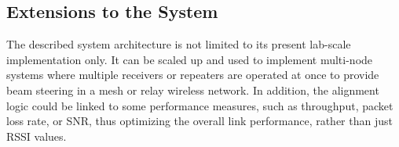 \subsection{Extensions to the System}

The described system architecture is not limited to its present lab-scale implementation only. It can be scaled up and used to implement multi-node systems where multiple receivers or repeaters are operated at once to provide beam steering in a mesh or relay wireless network. In addition, the alignment logic could be linked to some performance measures, such as throughput, packet loss rate, or SNR, thus optimizing the overall link performance, rather than just RSSI values.